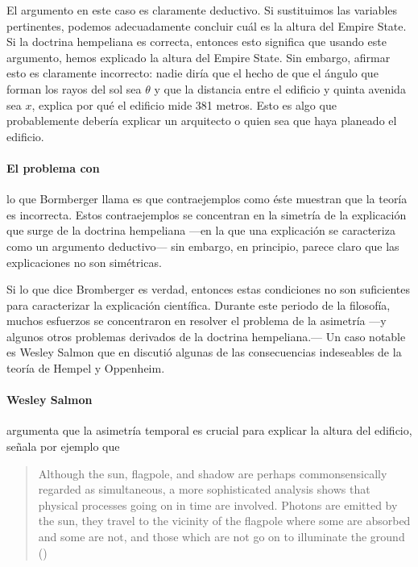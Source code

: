 El argumento en este caso es claramente deductivo. Si sustituimos las
variables pertinentes, podemos adecuadamente concluir cuál es la
altura del Empire State. Si la doctrina hempeliana es correcta,
entonces esto significa que usando este argumento, hemos explicado la
altura del Empire State. Sin embargo, afirmar esto es claramente incorrecto:
nadie diría que el hecho de que el ángulo que forman los rayos del sol sea
$\theta$ y que la distancia entre el edificio y quinta avenida sea $x$, explica
por qué el edificio mide 381 metros. Esto es algo que probablemente debería
explicar un arquitecto o quien sea que haya planeado el edificio.

\paragraph{El problema con} lo que Bormberger llama 
es que contraejemplos como éste muestran que la teoría es incorrecta. Estos
contraejemplos se concentran en la simetría de la explicación que surge de
la doctrina hempeliana ---en la que una explicación se caracteriza como un
argumento deductivo--- sin embargo, en principio, parece claro que las
explicaciones no son simétricas.

Si lo que dice Bromberger es verdad, entonces estas condiciones no son
suficientes para caracterizar la explicación científica. Durante este periodo
de la filosofía, muchos esfuerzos se concentraron en resolver el problema de
la asimetría ---y algunos otros problemas derivados de la doctrina
hempeliana.--- Un caso notable es Wesley Salmon que en 
discutió algunas de las consecuencias indeseables de la teoría de Hempel y
Oppenheim.

\paragraph{Wesley Salmon} argumenta que la asimetría temporal es crucial para
explicar la altura del edificio, señala por ejemplo que

\begin{quote}
	Although the sun, flagpole, and shadow are perhaps
	commonsensically regarded as simultaneous, a more sophisticated
	analysis shows that physical processes going on in time are
	involved. Photons are emitted by the sun, they travel to the
	vicinity of the flagpole where some are absorbed and some are
	not, and those which are not go on to illuminate the ground (\citeyear
	[p.~72]{Salmon1970})
\end{quote}

